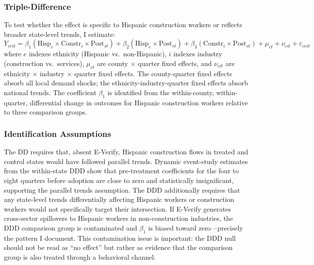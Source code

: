 \documentclass[12pt]{article}
\begin{document}
\subsubsection*{Triple-Difference} To test whether the effect is specific to Hispanic construction workers or reflects broader state-level trends, I estimate:
\begin{equation}
Y_{ceit} = \beta_1 (\text{Hisp}_e \times \text{Constr}_i \times \text{Post}_{st}) + \beta_2 (\text{Hisp}_e \times \text{Post}_{st}) + \beta_3 (\text{Constr}_i \times \text{Post}_{st}) + \mu_{ct} + \nu_{eit} + \varepsilon_{ceit}
\label{eq:ddd}
\end{equation}
where $e$ indexes ethnicity (Hispanic vs.\ non-Hispanic), $i$ indexes industry (construction vs.\ services), $\mu_{ct}$ are county $\times$ quarter fixed effects, and $\nu_{eit}$ are ethnicity $\times$ industry $\times$ quarter fixed effects. The county-quarter fixed effects absorb all local demand shocks; the ethnicity-industry-quarter fixed effects absorb national trends. The coefficient $\beta_1$ is identified from the within-county, within-quarter, differential change in outcomes for Hispanic construction workers relative to three comparison groups.

\subsubsection*{Identification Assumptions} The DD requires that, absent E-Verify, Hispanic construction flows in treated and control states would have followed parallel trends. Dynamic event-study estimates from the within-state DDD show that pre-treatment coefficients for the four to eight quarters before adoption are close to zero and statistically insignificant, supporting the parallel trends assumption. The DDD additionally requires that any state-level trends differentially affecting Hispanic workers or construction workers would not specifically target their intersection. If E-Verify generates cross-sector spillovers to Hispanic workers in non-construction industries, the DDD comparison group is contaminated and $\beta_1$ is biased toward zero---precisely the pattern I document. This contamination issue is important: the DDD null should not be read as ``no effect'' but rather as evidence that the comparison group is also treated through a behavioral channel.
\end{document}
